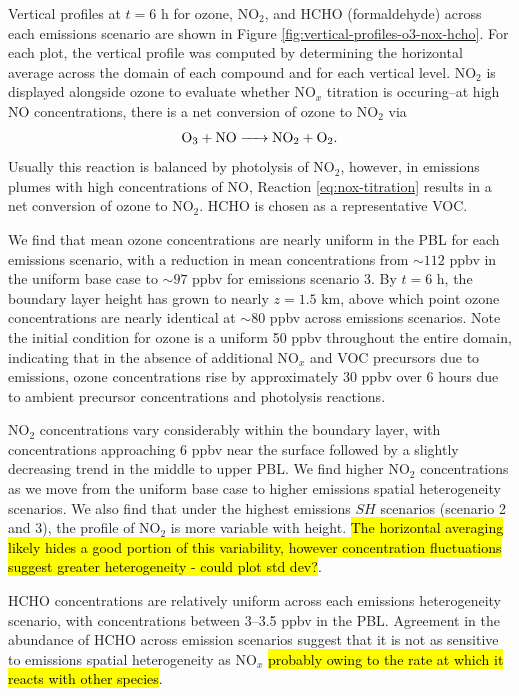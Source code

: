 Vertical profiles at $t=6$ h for ozone, NO$_2$, and HCHO (formaldehyde) across each emissions scenario are shown in Figure \ref{fig:vertical-profiles-o3-nox-hcho}. For each plot, the vertical profile was computed by determining the horizontal average across the domain of each compound and for each vertical level. NO$_2$ is displayed alongside ozone to evaluate whether NO$_x$ titration is occuring--at high NO concentrations, there is a net conversion of ozone to NO$_2$ via 
\begin{equation}
\ce{O_3 + NO -> NO_2 + O_2}.
\label{eq:nox-titration}
\end{equation}
Usually this reaction is balanced by photolysis of NO$_2$, however, in emissions plumes with high concentrations of NO, Reaction \ref{eq:nox-titration} results in a net conversion of ozone to NO$_2$. HCHO is chosen as a representative VOC.

We find that mean ozone concentrations are nearly uniform in the PBL for each emissions scenario, with a reduction in mean concentrations from $\sim 112$ ppbv in the uniform base case to $\sim 97$ ppbv for emissions scenario 3. By $t=6$ h, the boundary layer height has grown to nearly $z=1.5$ \si{km}, above which point ozone concentrations are nearly identical at $\sim80$ \si{ppbv} across emissions scenarios. Note the initial condition for ozone is a uniform 50 \si{ppbv} throughout the entire domain, indicating that in the absence of additional NO$_x$ and VOC precursors due to emissions, ozone concentrations rise by approximately 30 \si{ppbv} over 6 hours due to ambient precursor concentrations and photolysis reactions.

NO$_2$ concentrations vary considerably within the boundary layer, with concentrations approaching 6 ppbv near the surface followed by a slightly decreasing trend in the middle to upper PBL. We find higher NO$_2$ concentrations as we move from the uniform base case to higher emissions spatial heterogeneity scenarios. We also find that under the highest emissions $SH$ scenarios (scenario 2 and 3), the profile of NO$_2$ is more variable with height. \hl{The horizontal averaging likely hides a good portion of this variability, however concentration fluctuations suggest greater heterogeneity - could plot std dev?}.

HCHO concentrations are relatively uniform across each emissions heterogeneity scenario, with concentrations between 3--3.5 \si{ppbv} in the PBL. Agreement in the abundance of HCHO across emission scenarios suggest that it is not as sensitive to emissions spatial heterogeneity as NO$_x$ \hl{probably owing to the rate at which it reacts with other species}.

